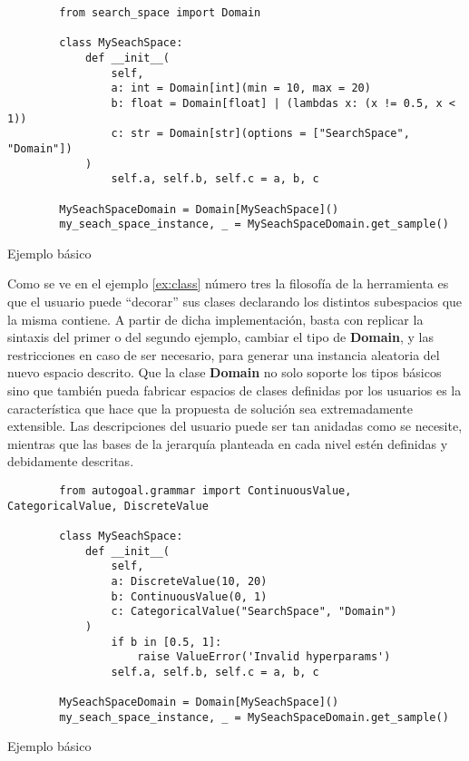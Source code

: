 \begin{listing}[!ht]
    \begin{verbatim}
        from search_space import Domain

        class MySeachSpace:
            def __init__(
                self, 
                a: int = Domain[int](min = 10, max = 20)
                b: float = Domain[float] | (lambdas x: (x != 0.5, x < 1))
                c: str = Domain[str](options = ["SearchSpace", "Domain"])
            )
                self.a, self.b, self.c = a, b, c

        MySeachSpaceDomain = Domain[MySeachSpace]()
        my_seach_space_instance, _ = MySeachSpaceDomain.get_sample()
    \end{verbatim}
    \caption{Ejemplo básico}
    \label{ex:class}
\end{listing}





Como se ve en el ejemplo \ref{ex:class} número tres la filosofía de la herramienta es que el usuario puede “decorar” sus
clases declarando los distintos subespacios que la misma contiene. A partir de dicha implementación, basta
con replicar la sintaxis del primer o del segundo ejemplo, cambiar el tipo de {\bf Domain}, y las restricciones
en caso de ser necesario, para generar una instancia aleatoria del nuevo espacio descrito. Que la clase
    {\bf Domain} no solo soporte los tipos básicos sino que también pueda fabricar espacios de clases definidas por
los usuarios es la característica que hace que la propuesta de solución sea extremadamente extensible. Las
descripciones del usuario puede ser tan anidadas como se necesite, mientras que las bases de la jerarquía
planteada en cada nivel estén definidas y debidamente descritas.



\begin{listing}[!ht]
    \begin{verbatim}
        from autogoal.grammar import ContinuousValue, CategoricalValue, DiscreteValue

        class MySeachSpace:
            def __init__(
                self, 
                a: DiscreteValue(10, 20)
                b: ContinuousValue(0, 1)
                c: CategoricalValue("SearchSpace", "Domain")
            )
                if b in [0.5, 1]:
                    raise ValueError('Invalid hyperparams')
                self.a, self.b, self.c = a, b, c

        MySeachSpaceDomain = Domain[MySeachSpace]()
        my_seach_space_instance, _ = MySeachSpaceDomain.get_sample()
    \end{verbatim}
    \caption{Ejemplo básico}
    \label{ex:autogoal}
\end{listing}


